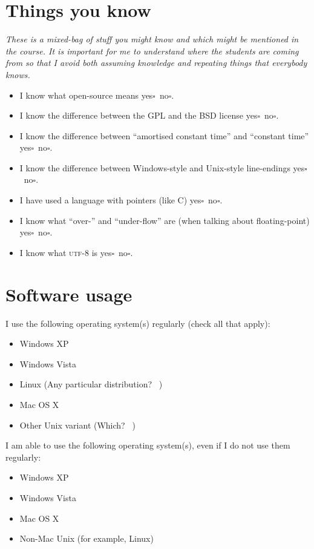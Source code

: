 \documentclass[article,twoside]{memoir}
\newcommand*{\fillunderscore}{~\hrulefill}
\newcommand*{\checkbox}{$\square$}
\newcommand*{\yesno}{\hfill\mbox{yes\checkbox~no\checkbox}}
\newcommand{\header}[1]{\textsl{#1}\par\medskip}
\begin{document}
\section{Things you know}
\header{These is a mixed-bag of stuff you might know and which might be mentioned in the course. It is important for me to understand where the students are coming from so that I avoid both assuming knowledge and repeating things that everybody knows.}

\begin{itemize}
\item I know what open-source means \yesno.
\item I know the difference between the GPL and the BSD license \yesno.
\item I know the difference between ``amortised constant time'' and ``constant time'' \yesno.
\item I know the difference between Windows-style and Unix-style line-endings \yesno.
\item I have used a language with pointers (like C) \yesno.
\item I know what ``over-'' and ``under-flow'' are (when talking about floating-point) \yesno.
\item I know what \textsc{utf-8} is \yesno.
\end{itemize}


\section{Software usage}

I use the following operating system(s) regularly (check all that apply):
\begin{itemize}[\checkbox]
\item Windows XP
\item Windows Vista
\item Linux (Any particular distribution? \fillunderscore)
\item Mac OS X
\item Other Unix variant (Which? \fillunderscore)
\end{itemize}

\medskip

I am able to use the following operating system(s), even if I do not use them regularly:
\begin{itemize}[\checkbox]
\item Windows XP
\item Windows Vista
\item Mac OS X
\item Non-Mac Unix (for example, Linux)
\end{itemize}
\end{document}

